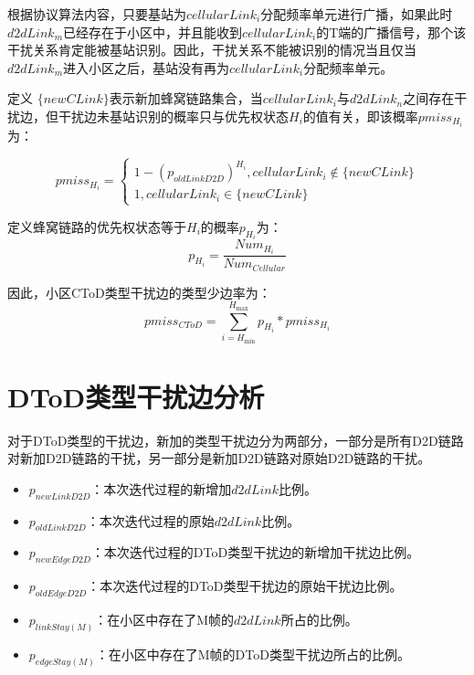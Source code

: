 \documentclass[figurelist,tablelist,algorithmlist,nomlist,masters]{seuthesix}
\begin{document}
	根据协议算法内容，只要基站为$cellularLin{k_i}$分配频率单元进行广播，如果此时$d2dLin{k_m}$已经存在于小区中，并且能收到$cellularLin{k_i}$的T端的广播信号，那个该干扰关系肯定能被基站识别。因此，干扰关系不能被识别的情况当且仅当$d2dLin{k_m}$进入小区之后，基站没有再为$cellularLin{k_i}$分配频率单元。
	
	定义 $\{ newCLink\} $表示新加蜂窝链路集合，当$cellularLin{k_i}$与$d2dLin{k_n}$之间存在干扰边，但干扰边未基站识别的概率只与优先权状态${H_i}$的值有关，即该概率$pmis{s_{{H_i}}}$为：
	
	\begin{equation}\label{eq3.1}
	pmis{s_{{H_i}}} = \left\{ \begin{array}{l}
	1 - {({p_{oldLinkD2D}})^{{H_i}}},cellularLin{k_i} \notin \{ newCLink\} \\
	1,cellularLin{k_i} \in \{ newCLink\} 
	\end{array} \right.
	\end{equation}
	
	定义蜂窝链路的优先权状态等于${H_i}$的概率${p_{{H_i}}}$为：
	\begin{equation}\label{eq3.1}
	{p_{{H_i}}} = \frac{{Nu{m_{{H_i}}}}}{{Nu{m_{Cellular}}}}
	\end{equation}
	
	因此，小区CToD类型干扰边的类型少边率为：
	\begin{equation}\label{eq3.1}
	pmis{s_{CToD}} = \sum\limits_{i = {H_{\min }}}^{{H_{\max }}} {{p_{{H_i}}}*pmis{s_{{H_i}}}}
	\end{equation}
	
	
	\section{DToD类型干扰边分析}
	对于DToD类型的干扰边，新加的类型干扰边分为两部分，一部分是所有D2D链路对新加D2D链路的干扰，另一部分是新加D2D链路对原始D2D链路的干扰。
	\begin{itemize}
		\item ${p_{newLinkD2D}}$：本次迭代过程的新增加$d2dLink$比例。
		\item ${p_{oldLinkD2D}}$：本次迭代过程的原始$d2dLink$比例。
		\item ${p_{newEdgeD2D}}$：本次迭代过程的DToD类型干扰边的新增加干扰边比例。
		\item ${p_{oldEdgeD2D}}$：本次迭代过程的DToD类型干扰边的原始干扰边比例。
		\item ${p_{linkStay(M)}}$：在小区中存在了M帧的$d2dLink$所占的比例。
		\item ${p_{edgeStay(M)}}$：在小区中存在了M帧的DToD类型干扰边所占的比例。
	\end{itemize}
	
\end{document}
